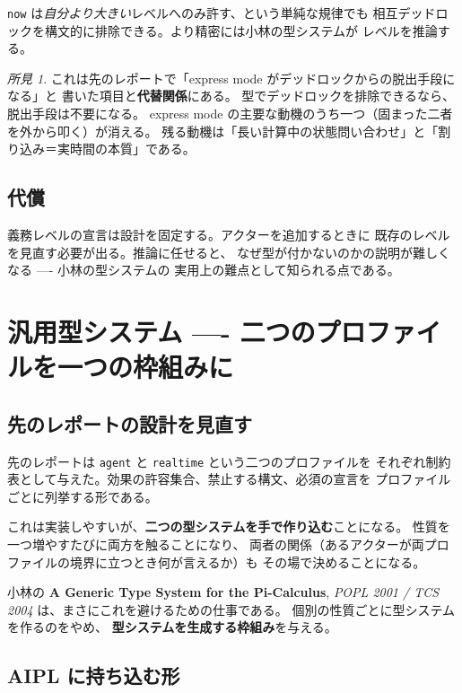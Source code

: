 \documentclass[11pt,a4paper]{ltjsarticle}
\theoremstyle{remark}
\newtheorem{finding}{所見}
\newcommand{\pp}[2]{\textbf{#1}, \emph{#2}}
\begin{document}
\texttt{now} は\emph{自分より大きい}レベルへのみ許す、という単純な規律でも
相互デッドロックを構文的に排除できる。より精密には小林の型システムが
レベルを推論する。

\begin{finding}
これは先のレポートで「express mode がデッドロックからの脱出手段になる」と
書いた項目と\textbf{代替関係}にある。
型でデッドロックを排除できるなら、脱出手段は不要になる。
express mode の主要な動機のうち一つ（固まった二者を外から叩く）が消える。
残る動機は「長い計算中の状態問い合わせ」と「割り込み＝実時間の本質」である。
\end{finding}

\subsection{代償}

義務レベルの宣言は設計を固定する。アクターを追加するときに
既存のレベルを見直す必要が出る。推論に任せると、
なぜ型が付かないのかの説明が難しくなる ---- 小林の型システムの
実用上の難点として知られる点である。

\section{汎用型システム ---- 二つのプロファイルを一つの枠組みに}

\subsection{先のレポートの設計を見直す}

先のレポートは \texttt{agent} と \texttt{realtime} という二つのプロファイルを
それぞれ制約表として与えた。効果の許容集合、禁止する構文、必須の宣言を
プロファイルごとに列挙する形である。

これは実装しやすいが、\textbf{二つの型システムを手で作り込む}ことになる。
性質を一つ増やすたびに両方を触ることになり、
両者の関係（あるアクターが両プロファイルの境界に立つとき何が言えるか）も
その場で決めることになる。

小林の \pp{A Generic Type System for the Pi-Calculus}{POPL 2001 / TCS 2004}
は、まさにこれを避けるための仕事である。
個別の性質ごとに型システムを作るのをやめ、
\textbf{型システムを生成する枠組み}を与える。

\subsection{AIPL に持ち込む形}
\end{document}
